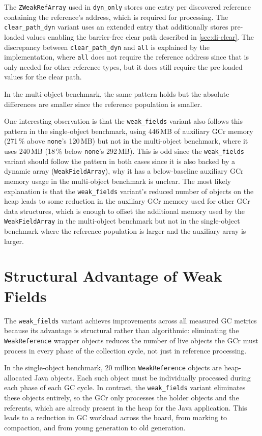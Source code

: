 The \texttt{ZWeakRefArray} used in \texttt{dyn\_only} stores one entry per discovered reference containing the reference's address, which is required for processing. The \texttt{clear\_path\_dyn} variant uses an extended entry that additionally stores pre-loaded values enabling the barrier-free clear path described in \cref{sec:di-clear}. The discrepancy between \texttt{clear\_path\_dyn} and \texttt{all} is explained by the implementation, where \texttt{all} does not require the reference address since that is only needed for other reference types, but it does still require the pre-loaded values for the clear path.

In the multi-object benchmark, the same pattern holds but the absolute differences are smaller since the reference population is smaller.

One interesting observation is that the \texttt{weak\_fields} variant also follows this pattern in the single-object benchmark, using 446\,MB of auxiliary \ac{GCr} memory (271\,\% above \texttt{none}'s 120\,MB) but not in the multi-object benchmark, where it uses 240\,MB (18\,\% below \texttt{none}'s 292\,MB). This is odd since the \texttt{weak\_fields} variant should follow the pattern in both cases since it is also backed by a dynamic array (\texttt{WeakFieldArray}), why it has a below-baseline auxiliary \ac{GCr} memory usage in the multi-object benchmark is unclear. The most likely explanation is that the \texttt{weak\_fields} variant's reduced number of objects on the heap leads to some reduction in the auxiliary \ac{GCr} memory used for other \ac{GCr} data structures, which is enough to offset the additional memory used by the \texttt{WeakFieldArray} in the multi-object benchmark but not in the single-object benchmark where the reference population is larger and the auxiliary array is larger.

\section{Structural Advantage of Weak Fields}
\label{sec:disc-wf}

The \texttt{weak\_fields} variant achieves improvements across all measured \ac{GC} metrics because its advantage is structural rather than algorithmic: eliminating the \texttt{WeakReference} wrapper objects reduces the number of live objects the \ac{GCr} must process in every phase of the collection cycle, not just in reference processing.

In the single-object benchmark, 20 million \texttt{WeakReference} objects are heap-allocated Java objects. Each such object must be individually processed during each phase of each \ac{GC} cycle. In contrast, the \texttt{weak\_fields} variant eliminates these objects entirely, so the \ac{GCr} only processes the holder objects and the referents, which are already present in the heap for the Java application. This leads to a reduction in \ac{GC} workload across the board, from marking to compaction, and from young generation to old generation.

